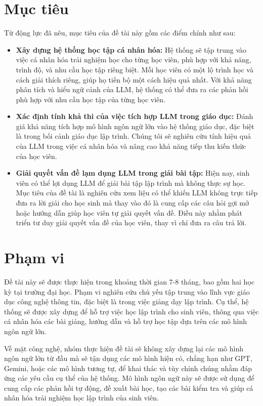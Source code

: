\section{Mục tiêu}
Từ động lực đã nêu, mục tiêu của đề tài này gồm các điểm chính như sau:
\begin{itemize}
    \item \textbf{Xây dựng hệ thống học tập cá nhân hóa: }Hệ thống sẽ tập trung vào việc cá nhân hóa trải nghiệm học cho từng học viên, phù hợp với khả năng, trình độ, và nhu cầu học tập riêng biệt. Mỗi học viên có một lộ trình học và cách giải thích riêng, giúp họ tiến bộ một cách hiệu quả nhất. Với khả năng phân tích và hiểu ngữ cảnh của LLM, hệ thống có thể đưa ra các phản hồi phù hợp với nhu cầu học tập của từng học viên.
    \item \textbf{Xác định tính khả thi của việc tích hợp LLM trong giáo dục: }Đánh giá khả năng tích hợp mô hình ngôn ngữ lớn vào hệ thống giáo dục, đặc biệt là trong bối cảnh giáo dục lập trình. Chúng tôi sẽ nghiên cứu tính hiệu quả của LLM trong việc cá nhân hóa và nâng cao khả năng tiếp thu kiến thức của học viên.
    \item \textbf{Giải quyết vấn đề lạm dụng LLM trong giải bài tập: }Hiện nay, sinh viên có thể lợi dụng LLM để giải bài tập lập trình mà không thực sự học. Mục tiêu của đề tài là nghiên cứu xem liệu có thể khiến LLM không trực tiếp đưa ra lời giải cho học sinh mà thay vào đó là cung cấp các câu hỏi gợi mở hoặc hướng dẫn giúp học viên tự giải quyết vấn đề. Điều này nhằm phát triển tư duy giải quyết vấn đề của học viên, thay vì chỉ đưa ra câu trả lời.
\end{itemize}
\section{Phạm vi}
\par Đề tài này sẽ được thực hiện trong khoảng thời gian 7-8 tháng, bao gồm hai học kỳ tại trường đại học. Phạm vi nghiên cứu chủ yếu tập trung vào lĩnh vực giáo dục công nghệ thông tin, đặc biệt là trong việc giảng dạy lập trình. Cụ thể, hệ thống sẽ được xây dựng để hỗ trợ việc học lập trình cho sinh viên, thông qua việc cá nhân hóa các bài giảng, hướng dẫn và hỗ trợ học tập dựa trên các mô hình ngôn ngữ lớn.

\par Về mặt công nghệ, nhóm thực hiện đề tài sẽ không xây dựng lại các mô hình ngôn ngữ lớn từ đầu mà sẽ tận dụng các mô hình hiện có, chẳng hạn như GPT, Gemini, hoặc các mô hình tương tự, để khai thác và tùy chỉnh chúng nhằm đáp ứng các yêu cầu cụ thể của hệ thống. Mô hình ngôn ngữ này sẽ được sử dụng để cung cấp các phản hồi tự động, đề xuất bài học, tạo các bài kiểm tra và giúp cá nhân hóa trải nghiệm học lập trình của sinh viên.

